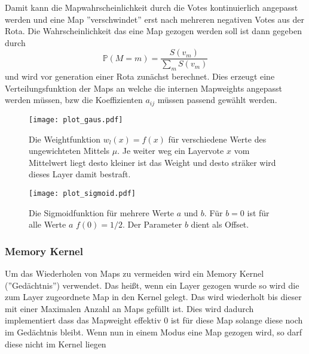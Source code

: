 \begin{itemize}
                Damit kann die Mapwahrscheinlichkeit durch die Votes kontinuierlich angepasst werden und eine Map ''verschwindet'' erst nach mehreren negativen Votes aus der Rota.
                Die Wahrscheinlichkeit das eine Map gezogen werden soll ist dann gegeben durch 
                \begin{equation}
                    \mathbb{P}(M=m) = \frac{S(v_m)}{\sum_m S(v_m)}
                \end{equation}
                und wird vor generation einer Rota zunächst berechnet. 
                Dies erzeugt eine Verteilungsfunktion der Maps an welche die internen Mapweights angepasst werden müssen, bzw die Koeffizienten $a_{ij}$ müssen passend gewählt werden.
            \end{itemize}
            \begin{figure}[htbp]
                \centering 
                \texttt{[image: plot\_gaus.pdf]}
                \caption{Die Weightfunktion $w_l(x)=f(x)$ für verschiedene Werte des ungewichteten Mittels $\mu$. 
                        Je weiter weg ein Layervote $x$ vom Mittelwert liegt desto kleiner ist das Weight und desto sträker wird dieses Layer damit bestraft. }
            \end{figure}
            \begin{figure}[htbp]
                \centering
                \texttt{[image: plot\_sigmoid.pdf]}
                \caption{Die Sigmoidfunktion für mehrere Werte $a$ und $b$. 
                            Für $b=0$ ist für alle Werte $a$ $f(0)=1/2$.
                            Der Parameter $b$ dient als Offset.}
            \end{figure}
        \subsubsection{Memory Kernel}
            Um das Wiederholen von Maps zu vermeiden wird ein Memory Kernel (''Gedächtnis'') verwendet. 
            Das heißt, wenn ein Layer gezogen wurde so wird die zum Layer zugeordnete Map in den Kernel gelegt. 
            Das wird wiederholt bis dieser mit einer Maximalen Anzahl an Maps gefüllt ist. 
            Dies wird dadurch implementiert dass das Mapweight effektiv $0$ ist für diese Map solange diese noch im Gedächtnis bleibt.
            Wenn nun in einem Modus eine Map gezogen wird, so darf diese nicht im Kernel liegen
